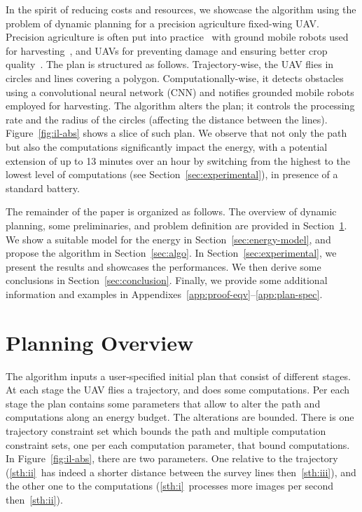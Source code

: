 \documentclass[letterpaper,10pt,conference]{ieeeconf}
\theoremstyle{definition}
\begin{document}
In the spirit of reducing costs and resources, we showcase the algorithm using the problem of dynamic planning for a precision agriculture fixed-wing UAV. Precision agriculture is often put into practice~\cite{hajjaj2014review} with ground mobile robots used for harvesting~\cite{qingchun2012study,dong2011development, de2011design, aljanobi2010setup, li2008analysis, edan2000robotic}, and UAVs for preventing damage and ensuring better crop quality~\cite{puri2017agriculture, daponte2019review}. The plan is structured as follows. Trajectory-wise, the UAV flies in circles and lines covering a polygon. Computationally-wise, it detects obstacles using a convolutional neural network (CNN) and notifies grounded mobile robots employed for harvesting. The algorithm alters the plan; it controls the processing rate and the radius of the circles (affecting the distance between the lines). Figure~\ref{fig:il-abs} shows a slice of such plan. We observe that not only the path but also the computations significantly impact the energy, with a potential extension of up to 13 minutes over an hour by switching from the highest to the lowest level of computations (see Section~\ref{sec:experimental}), in presence of a standard battery.

The remainder of the paper is organized as follows. The overview of dynamic planning, some preliminaries, and problem definition are provided in Section~\ref{sec:prob}. We show a suitable model for the energy in Section~\ref{sec:energy-model}, and propose the algorithm in Section~\ref{sec:algo}. In Section~\ref{sec:experimental}, we present the results and showcases the performances. We then derive some conclusions in Section~\ref{sec:conclusion}. Finally, we provide some additional information and examples in Appendixes~\ref{app:proof-eqv}--\ref{app:plan-spec}.


\section{Planning Overview}
\label{sec:prob}
 
The algorithm inputs a user-specified initial plan that consist of different stages. At each stage the UAV flies a trajectory, and does some computations. Per each stage the plan contains some parameters that allow to alter the path and computations along an energy budget. The alterations are bounded. There is one trajectory constraint set which bounds the path and multiple computation constraint sets, one per each computation parameter, that bound computations. In Figure~\ref{fig:il-abs}, there are two parameters. One relative to the trajectory (\ref{sth:ii}~has indeed a shorter distance between the survey lines then~\ref{sth:iii}), and the other one to the computations (\ref{sth:i}~processes more images per second then~\ref{sth:ii}). 
\end{document}
